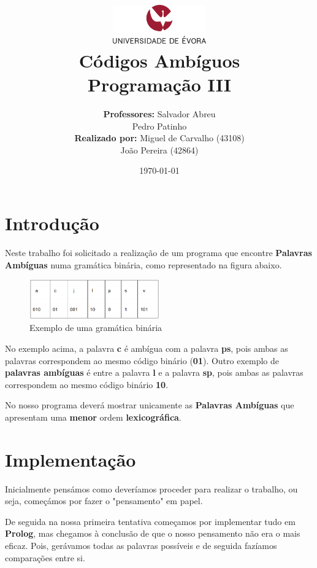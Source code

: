 \documentclass[11pt]{article}   %
\title
{
    \includegraphics[width=0.3\textwidth]{images/logo_universidade.png}
    \\[0.1cm]
    \textbf{Códigos Ambíguos} \\
    Programação III
}
\author
{
    \textbf{Professores:} Salvador Abreu \\ Pedro Patinho \\
    \textbf{Realizado por:} Miguel de Carvalho (43108) \\ João Pereira (42864) 
}
\date{\today}
\begin{document}
\maketitle

\section{Introdução} 
\hspace{0,5cm}Neste trabalho foi solicitado a realização de um programa que encontre 
\textbf{Palavras Ambíguas} numa gramática binária, como representado na figura abaixo.

\begin{figure}[h!]
    \begin{center}
        \includegraphics[width=0.5\textwidth]{images/gramatica.png}
        \caption{Exemplo de uma gramática binária}
    \end{center}
\end{figure}

No exemplo acima, a palavra \textbf{c} é ambígua com a palavra \textbf{ps}, pois ambas as
palavras correspondem ao mesmo código binário (\textbf{01}).
Outro exemplo de \textbf{palavras ambíguas} é entre a palavra \textbf{l} e a palavra \textbf{sp},
pois ambas as palavras correspondem ao mesmo código binário \textbf{10}.

No nosso programa deverá mostrar unicamente as \textbf{Palavras Ambíguas} que apresentam uma
\textbf{menor} ordem \textbf{lexicográfica}.
\section{Implementação}

\hspace{0,5cm}Inicialmente pensámos como deveríamos proceder para realizar o trabalho, ou seja,
começámos por fazer o "pensamento" em papel. 

De seguida na nossa primeira tentativa começamos por implementar tudo em \textbf{Prolog}, mas 
chegamos à conclusão de que o nosso pensamento não era o mais eficaz. Pois, gerávamos todas as
palavras possíveis e de seguida fazíamos comparações entre si.
\end{document}
